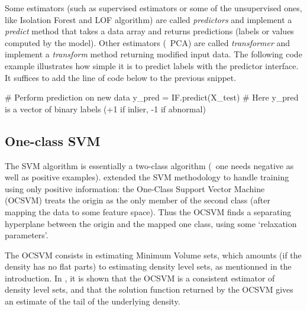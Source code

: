 Some estimators (such as supervised estimators or some of the unsupervised ones, like Isolation Forest and LOF algorithm) are called \emph{predictors} and implement a \emph{predict} method that takes a data array and returns predictions (labels or values computed by the model). Other estimators (\eg~PCA) are called \emph{transformer} and implement a \emph{transform} method returning modified input data.
The following code example illustrates how simple it is to predict labels with the predictor interface. It suffices to add the line of code below to the previous snippet.

\begin{pythoncode} 
# Perform prediction on new data
y_pred = IF.predict(X_test)  
# Here y_pred is a vector of binary labels (+1 if inlier, -1 if abnormal)
\end{pythoncode}





\subsection{One-class SVM}

The SVM algorithm is essentially a two-class algorithm (\ie~one needs negative as well as positive examples).
\cite{Scholkopf2001} extended the SVM methodology to handle training using only positive information:
the One-Class Support Vector Machine (OCSVM) treats the origin as the only member of the second class (after mapping the data to some feature space). Thus the OCSVM finds a separating hyperplane between the origin and the mapped one class, using some `relaxation parameters'.

The OCSVM consists in estimating Minimum Volume sets, which amounts (if the density has no flat parts) to estimating density level sets, as mentionned in the introduction.
In \cite{VertVert}, it is shown that the OCSVM is a consistent estimator of density level sets, and that the solution function returned by the OCSVM gives an estimate of the tail of the underlying density.

